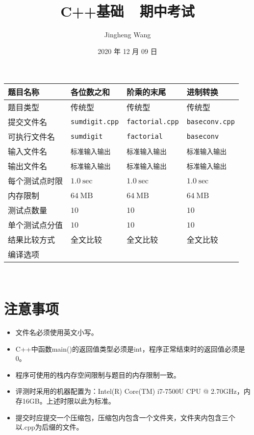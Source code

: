 \documentclass[12pt]{article}
\title{\Huge C++基础~~期中考试}
\author{Jingheng Wang}
\date{2020 年 12 月 09 日}
\begin{document}
	\maketitle
	\thispagestyle{empty}
	\begin{center}
		\begin{tabular}{|p{}|p{}|p{}|p{}|}
		\hline
		题目名称 & 各位数之和 & 阶乘的末尾 & 进制转换 \\
		\hline
		题目类型 & 传统型 & 传统型 & 传统型 \\
		\hline
		提交文件名 & \verb|sumdigit.cpp| & \verb|factorial.cpp| & \verb|baseconv.cpp| \\
		\hline
		可执行文件名 & \verb|sumdigit| & \verb|factorial| & \verb|baseconv| \\
		\hline
		输入文件名 & \verb|标准输入输出| & \verb|标准输入输出| & \verb|标准输入输出| \\
		\hline
		输出文件名 & \verb|标准输入输出| & \verb|标准输入输出| & \verb|标准输入输出| \\
		\hline
		每个测试点时限 & $1.0\ \mathrm{sec}$ & $1.0\ \mathrm{sec}$ & $1.0\ \mathrm{sec}$ \\
		\hline
		内存限制 & $64\ \mathrm{MB}$ & $64\ \mathrm{MB}$ & $64\ \mathrm{MB}$ \\
		\hline
		测试点数量 & $10$ & $10$ & $10$ \\
		\hline
		单个测试点分值 & $10$ & $10$ & $10$ \\
		\hline
		结果比较方式 & 全文比较 & 全文比较 & 全文比较  \\
		\hline
		编译选项 & \verb|| & \verb|| & \verb|| \\
		\hline
		\end{tabular}\\

		\section*{注意事项}
		\begin{itemize}
		\item 文件名必须使用英文小写。
		\item C++中函数main()的返回值类型必须是int，程序正常结束时的返回值必须是0。
		\item 程序可使用的栈内存空间限制与题目的内存限制一致。
		\item 评测时采用的机器配置为：Intel(R) Core(TM) i7-7500U CPU @ 2.70GHz，内存16GB。上述时限以此为标准。
		\item 提交时应提交一个压缩包，压缩包内包含一个文件夹，文件夹内包含三个以.cpp为后缀的文件。
		\end{itemize}
	\end{center}
	
\end{document}
